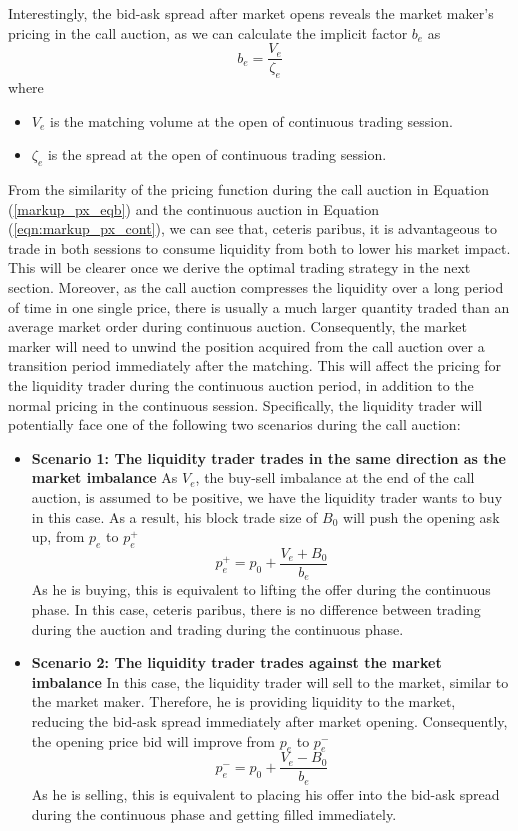 Interestingly, the bid-ask spread after market opens reveals the market maker's pricing in the call
auction, as we can calculate the implicit factor $b_e$ as
\begin{equation}\label{eqn:expected_spread}
  b_e = \frac{V_e}{\zeta_e}
\end{equation}
where
\begin{itemize}
  \item $V_e$ is the matching volume at the open of continuous trading session.
  \item $\zeta_e$ is the spread at the open of continuous trading session.
\end{itemize}

From the similarity of the pricing function during the call auction in Equation (\ref{markup_px_eqb}) and the continuous auction in Equation (\ref{eqn:markup_px_cont}), we can see that, ceteris paribus, it is advantageous to trade in both sessions to consume liquidity from both to lower his market impact. This will be clearer once we derive the optimal trading strategy in the next section. Moreover, as the call auction compresses the liquidity over a long period of time in one single price, there is usually a much larger quantity traded than an average market order during continuous auction. Consequently, the market marker will need to unwind the position acquired from the call auction over a transition period immediately after the matching. This will affect the pricing for the liquidity trader during the continuous auction period, in addition to the normal pricing in the continuous session. Specifically, the liquidity trader will potentially face one of the following two scenarios during the call auction:

\begin{itemize}
  \item {\textbf{Scenario 1: The liquidity trader trades in the same direction as the market imbalance}
        As $V_e$, the buy-sell imbalance at the end of the call auction, is assumed to be positive, we have the liquidity trader wants to buy in this case. As a result, his block trade size of $B_0$ will push the opening ask up, from $p_e$ to $p_e^+$
        \[
          p_e^+ =  p_0 + \frac{V_e + B_0}{b_e}
        \]
        As he is buying, this is equivalent to lifting the offer during the continuous phase. In this case, ceteris paribus, there is no difference between trading during the auction and trading during the continuous phase.
        }
  \item {
        \textbf{Scenario 2: The liquidity trader trades against the market imbalance}
        In this case, the liquidity trader will sell to the market, similar to the market maker. Therefore, he is providing liquidity to the market, reducing the bid-ask spread immediately after market opening. Consequently, the opening price bid will improve from $p_e$ to $p_e^-$
        \[
          p_e^- = p_0 + \frac{V_e - B_0}{b_e}
        \]
        As he is selling, this is equivalent to placing his offer into the bid-ask spread during the continuous phase and getting filled immediately.
        }
\end{itemize}

